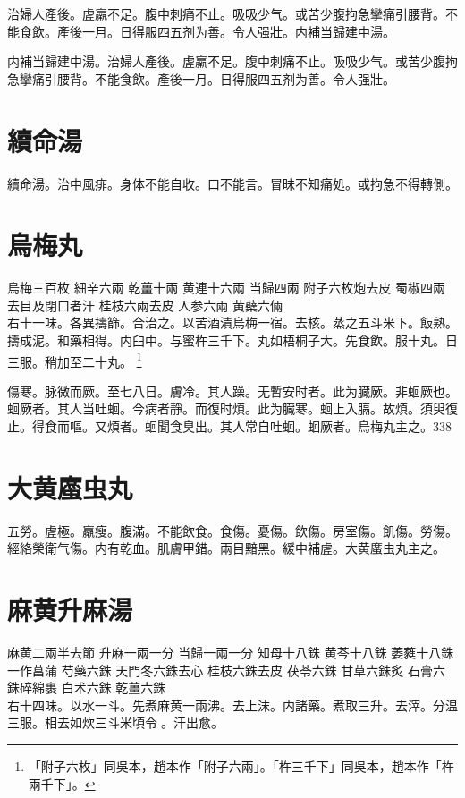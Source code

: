 治婦人產後。虗羸不足。腹中刺痛不止。吸吸少气。或苦少腹拘急攣痛引腰背。不能食飲。產後一月。日得服四五剂为善。令人强壯。内補当歸建中湯。{\wuben}

内補当歸建中湯。治婦人產後。虗羸不足。腹中刺痛不止。吸吸少气。或苦少腹拘急攣痛引腰背。不能食飲。產後一月。日得服四五剂为善。令人强壯。{\dengben}

\section{續命湯}

續命湯。治中風痱。身体不能自收。口不能言。冒昧不知痛処。或拘急不得轉側。

\section{烏梅丸}

烏梅{\scriptsize 三百枚} 細辛{\scriptsize 六兩} 乾薑{\scriptsize 十兩} 黄連{\scriptsize 十六兩} 当歸{\scriptsize 四兩} 附子{\scriptsize 六枚炮去皮} 蜀椒{\scriptsize 四兩去目及閉口者汗} 桂枝{\scriptsize 六兩去皮} 人参{\scriptsize 六兩} 黄蘗{\scriptsize 六倆}\\
右十一味。{\khaaitp 各}異擣篩。合治之。以苦酒漬烏梅一宿。去核。蒸之五斗米下。飯熟。擣成泥。和藥相得。内臼中。与蜜杵三千下。丸如梧桐子大。先食飲。服十丸。日三服。稍加{\khaaitp 至}二十丸。
	\footnote{
		「附子六枚」同吳本，趙本作「附子六兩」。「杵三千下」同吳本，趙本作「杵兩千下」。
	}

傷寒。脉微而厥。至七八日。膚冷。其人躁。无暫安时者。此为臓厥。非蛔厥也。蛔厥者。其人当吐蛔。今病者靜。而復时煩。此为臓寒。蛔上入膈。故煩。須臾復止。得食而嘔。又煩者。蛔聞食臭出。其人常自吐蛔。蛔厥者。烏梅丸主之。338

\section{大黄䗪虫丸}

五勞。虗極。羸瘦。腹滿。不能飲食。食傷。憂傷。飲傷。房室傷。飢傷。勞傷。經絡榮衛气傷。内有乾血。肌膚甲錯。兩目黯黑。緩中補虗。大黄䗪虫丸主之。

\section{麻黄升麻湯}

麻黄{\scriptsize 二兩半去節} 升麻{\scriptsize 一兩一分} 当歸{\scriptsize 一兩一分} 知母{\scriptsize 十八銖} 黄芩{\scriptsize 十八銖} 萎蕤{\scriptsize 十八銖一作菖蒲} 芍藥{\scriptsize 六銖} 天門冬{\scriptsize 六銖去心} 桂枝{\scriptsize 六銖去皮} 茯苓{\scriptsize 六銖} 甘草{\scriptsize 六銖炙} 石膏{\scriptsize 六銖碎綿裹} 白术{\scriptsize 六銖} 乾薑{\scriptsize 六銖}\\
右十四味。以水一斗。先煮麻黄一兩沸。去上沫。内諸藥。煮取三升。去滓。分温三服。相去如炊三斗米頃令{\sungtpii 𥁞}。汗出愈。

